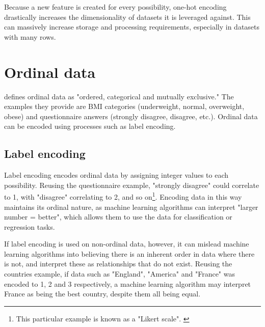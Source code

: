 \para Because a new feature is created for every possibility, one-hot encoding drastically increases the dimensionality of 
datasets it is leveraged against. This can massively increase storage and processing requirements, especially in datasets 
with many rows.

\section{Ordinal data}
\textcite{oxford_brookes_university_types_nodate} defines ordinal data as "ordered, categorical and mutually exclusive."
The examples they provide are BMI categories (underweight, normal, overweight, obese) and questionnaire answers (strongly disagree,
disagree, etc.). Ordinal data can be encoded using processes such as label encoding.

\subsection{Label encoding}
Label encoding encodes ordinal data by assigning integer values to each possibility. Reusing the questionnaire example, "strongly disagree"
could correlate to 1, with "disagree" correlating to 2, and so on\footnote{This particular example is known as a "Likert scale". \autocite{oxford_brookes_university_types_nodate}}. 
Encoding data in this way maintains its ordinal nature, as machine learning algorithms can interpret "larger number = better", which allows them
to use the data for classification or regression tasks. 

\para If label encoding is used on non-ordinal data, however, it can mislead machine learning algorithms into believing there is an inherent 
order in data where there is not, and interpret these as relationships that do not exist. Reusing the countries example, if data such 
as "England", "America" and "France" was encoded to 1, 2 and 3 respectively, a machine learning algorithm may interpret France as being the 
best country, despite them all being equal. 